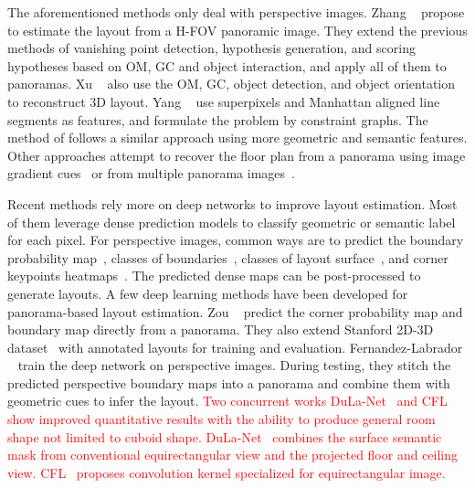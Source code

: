 \documentclass[10pt,twocolumn,letterpaper]{article}
\newcommand{\threesixty}{\text{360$^\circ$}\xspace}
\newcommand{\revise}[1]{\textcolor{red}{#1}}
\newcommand{\revise}[1]{#1}
\begin{document}
The aforementioned methods only deal with perspective images. Zhang \etal~\cite{zhang2014panocontext} propose to estimate the layout from a \threesixty H-FOV panoramic image. They extend the previous methods of vanishing point detection, hypothesis generation, and scoring hypotheses based on OM, GC and object interaction, and apply all of them to panoramas. Xu \etal~\cite{xu2017pano2cad} also use the OM, GC, object detection, and object orientation to reconstruct 3D layout. Yang \etal~\cite{yang2016efficient} use superpixels and Manhattan aligned line segments as features, and formulate the problem by constraint graphs. The method of \cite{yang2018automatic} follows a similar approach using more geometric and semantic features. Other approaches attempt to recover the floor plan from a panorama using image gradient cues~\cite{pintore2016omnidirectional} or from multiple panorama images~\cite{cabral2014piecewise}.


Recent methods rely more on deep networks to improve layout estimation.
Most of them leverage dense prediction models to classify geometric or semantic label for each pixel.
For perspective images, common ways are to predict the boundary probability map~\cite{mallya2015learning,ren2016coarse}, classes of boundaries~\cite{zhao2017physics,ren2016coarse}, classes of layout surface~\cite{dasgupta2016delay,izadinia2017im2cad}, and corner keypoints heatmaps~\cite{lee2017roomnet}.
The predicted dense maps can be post-processed to generate layouts.
A few deep learning methods have been developed for panorama-based layout estimation.
Zou \etal~\cite{zou2018layoutnet} predict the corner probability map and boundary map directly from a panorama.
They also extend Stanford 2D-3D dataset~\cite{2017arXiv170201105A} with annotated layouts for training and evaluation.
Fernandez-Labrador \etal~\cite{fernandez2018layouts} train the deep network on perspective images.
During testing, they stitch the predicted perspective boundary maps into a panorama and combine them with geometric cues to infer the layout.
\revise{
Two concurrent works DuLa-Net~\cite{yang2018dula} and CFL~\cite{fernandez2019CFL} show improved quantitative results with the ability to produce general room shape not limited to cuboid shape.
DuLa-Net~\cite{yang2018dula} combines the surface semantic mask from conventional equirectangular view and the projected floor and ceiling view.
CFL~\cite{fernandez2019CFL} proposes convolution kernel specialized for equirectangular image.
}
\end{document}

